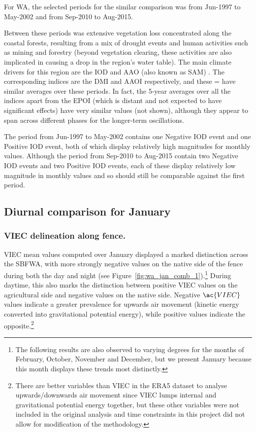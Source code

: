For \ac{WA}, the selected periods for the similar comparison was from Jun-1997 to May-2002 and from Sep-2010 to Aug-2015. 

Between these periods was extensive vegetation loss concentrated along the coastal forests, resulting from a mix of drought events and human activities such as mining and forestry (beyond vegetation clearing, these activities are also implicated in causing a drop in the region's water table). The main climate drivers for this region are the \ac{IOD} and \ac{AAO} (also known as \ac{SAM}) \citep{wa_drivers}. The corresponding indices are the \ac{DMI} and \ac{AAOI} respectively, and these = have similar averages over these periods. In fact, the 5-year averages over all the indices apart from the \ac{EPOI} (which is distant and not expected to have significant effects) have very similar values (not shown), although they appear to span across different phases for the longer-term oscillations.

The period from Jun-1997 to May-2002 contains one Negative \ac{IOD} event and one Positive \ac{IOD} event, both of which display relatively high magnitudes for monthly values. Although the period from Sep-2010 to Aug-2015 contain two Negative \ac{IOD} events and two Positive \ac{IOD} events, each of these display relatively low magnitude in monthly values and so should still be comparable against the first period.

\subsection{Diurnal comparison for January}

\subsubsection{VIEC delineation along fence.}

\ac{VIEC} mean values computed over January displayed a marked distinction across the \acf{SBFWA}, with more strongly negative values on the native side of the fence during both the day and night (see Figure~\ref{fig:wa_jan_comb_1}).\footnote{The following results are also observed to varying degrees for the months of February, October, November and December, but we present January because this month displays these trends most distinctly.} During daytime, this also marks the distinction between positive \ac{VIEC} values on the agricultural side and negative values on the native side. Negative $\ac{VIEC}$ values indicate a greater prevalence for upwards air movement (kinetic energy converted into gravitational potential energy), while positive values indicate the opposite.\footnote{There are better variables than \ac{VIEC} in the ERA5 dataset to analyse upwards/downwards air movement since \ac{VIEC} lumps internal and gravitational potential energy together, but these other variables were not included in the original analysis and time constraints in this project did not allow for modification of the methodology.}

